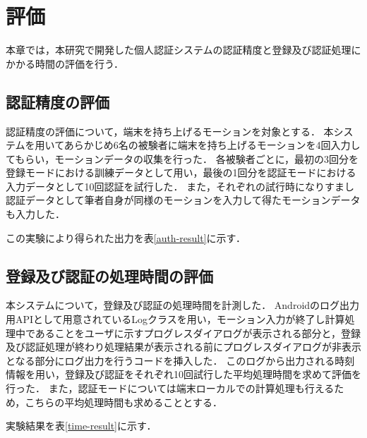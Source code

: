 \chapter{評価}
本章では，本研究で開発した個人認証システムの認証精度と登録及び認証処理にかかる時間の評価を行う．

\section{認証精度の評価}
認証精度の評価について，端末を持ち上げるモーションを対象とする．
本システムを用いてあらかじめ6名の被験者に端末を持ち上げるモーションを4回入力してもらい，モーションデータの収集を行った．
各被験者ごとに，最初の3回分を登録モードにおける訓練データとして用い，最後の1回分を認証モードにおける入力データとして10回認証を試行した．
また，それぞれの試行時になりすまし認証データとして筆者自身が同様のモーションを入力して得たモーションデータも入力した．

この実験により得られた出力を表\ref{auth-result}に示す．


\section{登録及び認証の処理時間の評価}
本システムについて，登録及び認証の処理時間を計測した．
Androidのログ出力用APIとして用意されているLogクラス\cite{5-log}を用い，モーション入力が終了し計算処理中であることをユーザに示すプログレスダイアログが表示される部分と，登録及び認証処理が終わり処理結果が表示される前にプログレスダイアログが非表示となる部分にログ出力を行うコードを挿入した．
このログから出力される時刻情報を用い，登録及び認証をそれぞれ10回試行した平均処理時間を求めて評価を行った．
また，認証モードについては端末ローカルでの計算処理も行えるため，こちらの平均処理時間も求めることとする．

実験結果を表\ref{time-result}に示す．
